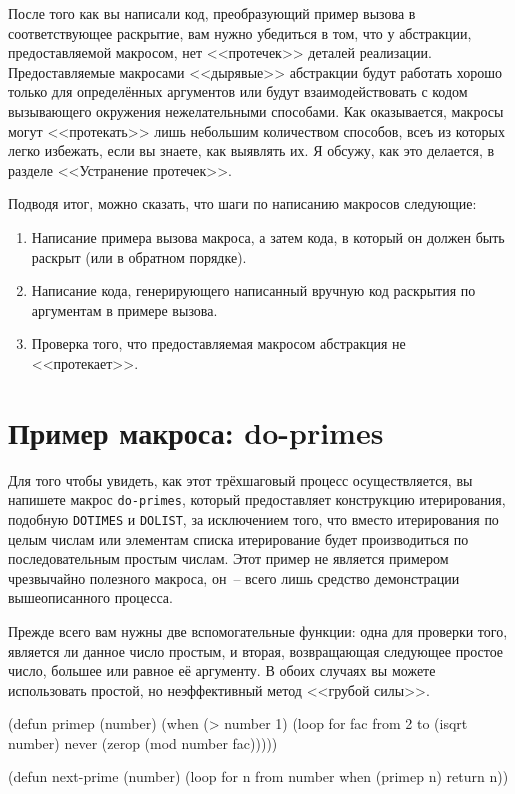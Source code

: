 После того как вы написали код, преобразующий пример вызова в соответствующее раскрытие,
вам нужно убедиться в том, что у абстракции, предоставляемой макросом, нет <<протечек>>
деталей реализации. Предоставляемые макросами <<дырявые>> абстракции будут работать хорошо
только для определённых аргументов или будут взаимодействовать с кодом вызывающего
окружения нежелательными способами. Как оказывается, макросы могут <<протекать>> лишь
небольшим количеством способов, всеъ из которых легко избежать, если вы знаете, как
выявлять их. Я обсужу, как это делается, в разделе <<Устранение протечек>>.

Подводя итог, можно сказать, что шаги по написанию макросов следующие:

\begin{enumerate}
\item Написание примера вызова макроса, а затем кода, в который он должен быть раскрыт
  (или в обратном порядке).
  
\item Написание кода, генерирующего написанный вручную код раскрытия по аргументам в
  примере вызова.

\item Проверка того, что предоставляемая макросом абстракция не <<протекает>>.
\end{enumerate}

\section{Пример макроса: do-primes}

Для того чтобы увидеть, как этот трёхшаговый процесс осуществляется, вы напишете макрос
\lstinline{do-primes}, который предоставляет конструкцию итерирования, подобную
\lstinline{DOTIMES} и \lstinline{DOLIST}, за исключением того, что вместо итерирования по целым
числам или элементам списка итерирование будет производиться по последовательным простым
числам. Этот пример не является примером чрезвычайно полезного макроса, он~-- всего лишь
средство демонстрации вышеописанного процесса.

Прежде всего вам нужны две вспомогательные функции: одна для проверки того, является ли
данное число простым, и вторая, возвращающая следующее простое число, большее или равное
её аргументу. В обоих случаях вы можете использовать простой, но неэффективный метод
<<грубой силы>>.

\begin{myverb}
(defun primep (number)
  (when (> number 1)
    (loop for fac from 2 to (isqrt number) 
          never (zerop (mod number fac)))))

(defun next-prime (number)
  (loop for n from number when (primep n) return n))
\end{myverb}

